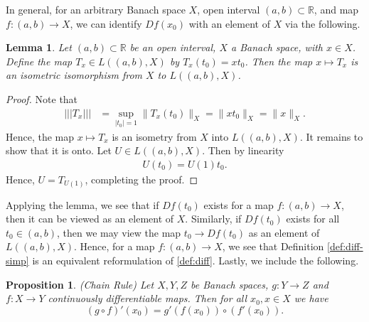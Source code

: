 \documentclass[12pt,reqno]{amsart}
\numberwithin{equation}{section}  %
\numberwithin{figure}{section}
\newcommand{\rr}{\mathbb{R}}
\theoremstyle{plain}
\newtheorem{proposition}{Proposition}
\newtheorem{lemma}{Lemma}
\theoremstyle{definition}
\theoremstyle{remark}
\begin{document}
%
%
In general, for an arbitrary Banach space $X$, open interval $(a,b) \subset
\rr$, and map $f:(a,b) \to X$, we can identify $Df(x_0)$ with an
element of $X$ via the following.
%
%
%
%
%
%
%
%
\begin{lemma}
	\label{lem:isometry} Let $(a,b) \subset \rr$ be an open interval, $X$ a Banach
	space, with $x \in X$. Define the map $T_x \in L\left ( (a,b) , X \right )$ by
	$T_x(t_0) = x t_0$. Then the map $x \mapsto T_x$ is an
	isometric isomorphism from
	$X$ to $L((a,b) , X)$. 
\end{lemma}
%
%
\begin{proof} Note that 
%
%
\begin{equation*}
	\begin{split}
		| | | T_x | | |
		& = \sup_{|t_0| = 1} \| T_x (t_0) \|_X
		= \| x t_0\|_X
		= \|x\|_X.
	\end{split}
\end{equation*}
%
%
Hence, the map $x \mapsto T_x$ is an isometry from $X$ into $L((a,b),
X)$. It remains to show that it is onto. Let $U \in L( (a,b), X)$. Then
by linearity
%
%
\begin{equation*}
	\begin{split}
		U(t_0) = U(1)t_0. 
	\end{split}
\end{equation*}
%
%
Hence, $U = T_{U(1)}$, completing the proof. 
\end{proof}
%
%
Applying the lemma, we see that if $Df(t_0)$ exists for a map $f: (a,b) \to X$,
then it can be viewed as an
element of $X$. Similarly, if $Df(t_0)$ exists for all $t_0 \in (a,b)$, then
we may view the map $t_0 \to Df(t_0)$ as an
element of $L( (a,b), X)$. Hence, for a
map $f:(a,b) \to X$, we see that Definition \ref{def:diff-simp} is an equivalent
reformulation of \autoref{def:diff}. 
Lastly, we include the following.
%
%
\begin{proposition}
		(Chain Rule) Let $X,Y,Z$ be Banach spaces, $g: Y \to Z$ and $f:
		X \to Y$ continuously differentiable maps. Then for all $x_0,
		x \in X$ we have \begin{equation*} (g \circ f)' (x_0) =
			g'(f(x_0)) \circ (f'(x_0)).
		\end{equation*} 
	\end{proposition}
\end{document}
